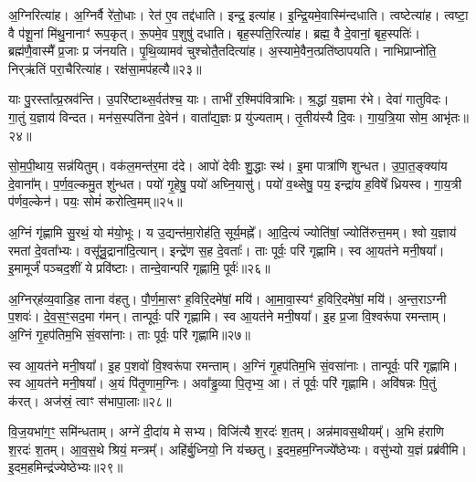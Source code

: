अ॒ग्निरित्या॑ह।
अ॒ग्निर्वै रे॑तो॒धाः।
रेत॑ ए॒व तद्द॑धाति।
इन्द्र॒ इत्या॑ह।
इ॒न्द्रि॒यमे॒वास्मि॑न्दधाति।
त्वष्टेत्या॑ह।
त्वष्टा॒ वै प॑शू॒नां मि॑थु॒नानाꣳ॑ रूप॒कृत्।
रू॒पमे॒व प॒शुषु॑ दधाति।
बृह॒स्पति॒रित्या॑ह।
ब्रह्म॒ वै दे॒वानां॒ बृह॒स्पतिः॑।
ब्रह्म॑णै॒वास्मै᳚ प्र॒जाः प्र ज॑नयति।
पृ॒थि॒व्यामव॑ चुश्चोतै॒तदित्या॑ह।
अ॒स्यामे॒वैन॒त्प्रति॑\-ष्ठापयति।
नाभिप्राप्नो॑ति॒ निर्‌\mbox{}ऋ॑तिं परा॒चैरित्या॑ह।
रक्ष॑सा॒मप॑हत्यै॥२३॥

याः पु॒रस्ता᳚त्प्र॒स्रव॑न्ति।
उ॒परि॑ष्टाथ्स॒र्वत॑श्च॒ याः।
ताभी॑ र॒श्मिप॑वित्राभिः।
श्र॒द्धां य॒ज्ञमा र॑भे।
देवा॑ गातुविदः।
गा॒तुं य॒ज्ञाय॑ विन्दत।
मन॑स॒स्पति॑ना दे॒वेन॑।
वाता᳚द्य॒ज्ञः प्र यु॑ज्यताम्।
तृ॒तीय॑स्यै दि॒वः।
गा॒य॒त्रि॒या सोम॒ आभृ॑तः॥२४॥

सो॒म॒पी॒थाय॒ सन्न॑यितुम्।
वक॑ल॒मन्त॑र॒मा द॑दे।
आपो॑ देवीः शु॒द्धाः स्थ॑।
इ॒मा पात्रा॑णि शुन्धत।
उ॒पा॒त॒ङ्क्या॑य दे॒वाना᳚म्।
प॒र्ण॒व॒ल्कमु॒त शु॑न्धत।
पयो॑ गृ॒हेषु॒ पयो॑ अघ्नि॒यासु॑।
पयो॑ व॒थ्सेषु॒ पय॒ इन्द्रा॑य ह॒विषे᳚ ध्रियस्व।
गा॒य॒त्री प॑र्णव॒ल्केन॑।
पयः॒ सोमं॑ करोत्वि॒मम्॥२५॥

अ॒ग्निं गृ॑ह्णामि सु॒रथं॒ यो म॑यो॒भूः।
य उ॒द्यन्त॑मा॒रोह॑ति॒ सूर्य॒मह्ने᳚।
आ॒दि॒त्यं ज्योति॑षां॒ ज्योति॑रुत्त॒मम्।
श्वो य॒ज्ञाय॑ रमतां दे॒वता᳚भ्यः।
वसू᳚न्रु॒द्राना॑दि॒त्यान्।
इन्द्रे॑ण स॒ह दे॒वताः᳚।
ताः पूर्वः॒ परि॑ गृह्णामि।
स्व आ॒यत॑ने मनी॒षया᳚।
इ॒मामूर्जं॑ पञ्चद॒शीं ये प्रवि॑ष्टाः।
तान्दे॒वान्परि॑ गृह्णामि॒ पूर्वः॑॥२६॥

अ॒ग्निर्‌\mbox{}ह॑व्य॒वाडि॒ह ताना व॑हतु।
पौ॒र्ण॒मा॒सꣳ ह॒विरि॒दमे॑षां॒ मयि॑।
आ॒मा॒वा॒स्यꣳ॑ ह॒विरि॒दमे॑षां॒ मयि॑।
अ॒न्त॒रा\-ऽग्नी प॒शवः॑।
दे॒व॒स॒ꣳ॒सद॒मा ग॑मन्।
तान्पूर्वः॒ परि॑ गृह्णामि।
स्व आ॒यत॑ने मनी॒षया᳚।
इ॒ह प्र॒जा वि॒श्वरू॑पा रमन्ताम्।
अ॒ग्निं गृ॒हप॑तिम॒भि सं॒वसा॑नाः।
ताः पूर्वः॒ परि॑ गृह्णामि॥२७॥

स्व आ॒यत॑ने मनी॒षया᳚।
इ॒ह प॒शवो॑ वि॒श्वरू॑पा रमन्ताम्।
अ॒ग्निं गृ॒हप॑तिम॒भि सं॒वसा॑नाः।
तान्पूर्वः॒ परि॑ गृह्णामि।
स्व आ॒यत॑ने मनी॒षया᳚।
अ॒यं पि॑तृ॒णाम॒ग्निः।
अवा᳚ड्ढ॒व्या पि॒तृभ्य॒ आ।
तं पूर्वः॒ परि॑ गृह्णामि।
अवि॑षन्नः पि॒तुं क॑रत्।
अज॑स्रं॒ त्वाꣳ स॑भापा॒लाः॥२८॥

वि॒ज॒यभा॑ग॒ꣳ॒ समि॑न्धताम्।
अग्ने॑ दी॒दा॑य मे सभ्य।
विजि॑त्यै श॒रदः॑ श॒तम्।
अन्न॑मावस॒थीयम्᳚।
अ॒भि ह॑राणि श॒रदः॑ श॒तम्।
आ॒व॒स॒थे श्रियं॒ मन्त्रम्᳚।
अहि॑र्बु॒ध्नियो॒ नि य॑च्छतु।
इ॒दम॒हम॒ग्निज्ये᳚ष्ठेभ्यः।
वसु॑भ्यो य॒ज्ञं प्रब्र॑वीमि।
इ॒दम॒हमिन्द्र॑ज्येष्ठेभ्यः॥२९॥

